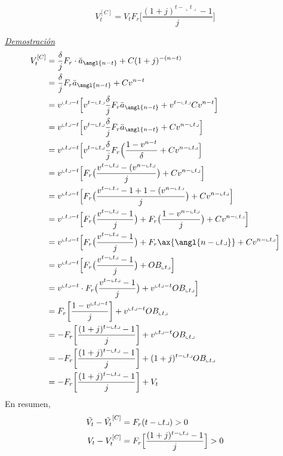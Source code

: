 \begin{proposition}
$$V_t^{[C]} = V_t F_r\Big[\frac{(1+j)^{t-\llcorner t\lrcorner}-1}{j}\Big]$$
\end{proposition}
\underline{\textit{Demostración}}
\begin{align*}
    V_t^{[C]} &= \frac{\delta}{j}F_r\cdot\Bar{a}_{\angl{n-t}} + C(1+j)^{-(n-t)}\\
    &= \frac{\delta}{j}F_r\Bar{a}_{\angl{n-t}} + Cv^{n-t}\\
    &= v^{\llcorner t\lrcorner-t}\Big[v^{t-\llcorner t\lrcorner}\frac{\delta}{j}F_r\Bar{a}_{\angl{n-t}} + v^{t-\llcorner t\lrcorner} Cv^{n-t}\Big]\\
    &= v^{\llcorner t\lrcorner-t}\Big[v^{t-\llcorner t\lrcorner}\frac{\delta}{j}F_r\Bar{a}_{\angl{n-t}} + Cv^{n-\llcorner t\lrcorner}\Big]\\
    &= v^{\llcorner t\lrcorner-t}\Big[v^{t-\llcorner t\lrcorner}\frac{\delta}{j}F_r\Big(\frac{1-v^{n-t}}{\delta} + Cv^{n-\llcorner t\lrcorner}\Big]\\
    &= v^{\llcorner t\lrcorner-t}\Big[F_r\big(\frac{v^{t-\llcorner t\lrcorner}-(v^{n-\llcorner t\lrcorner}}{j}\big) + Cv^{n-\llcorner t\lrcorner}\Big]\\
    &= v^{\llcorner t\lrcorner-t}\Big[F_r\big(\frac{v^{t-\llcorner t\lrcorner}-1+1-(v^{n-\llcorner t\lrcorner}}{j}\big) + Cv^{n-\llcorner t\lrcorner}\Big]\\
    &= v^{\llcorner t\lrcorner-t}\Big[F_r\big(\frac{v^{t-\llcorner t\lrcorner}-1}{j}\big) + F_r\big(\frac{1-v^{n-\llcorner t\lrcorner}}{j}\big) + Cv^{n-\llcorner t\lrcorner}\Big]\\
    &= v^{\llcorner t\lrcorner-t}\Big[F_r\big(\frac{v^{t-\llcorner t\lrcorner}-1}{j}\big) + F_r\ax{\angl{n-\llcorner t\lrcorner}} + Cv^{n-\llcorner t\lrcorner}\Big]\\
    &= v^{\llcorner t\lrcorner-t}\Big[F_r\big(\frac{v^{t-\llcorner t\lrcorner}-1}{j}\big) + OB_{\llcorner t\lrcorner}\Big]\\
    &= v^{\llcorner t\lrcorner-t}\cdot F_r\big(\frac{v^{t-\llcorner t\lrcorner}-1}{j}\big) + v^{\llcorner t\lrcorner-t}OB_{\llcorner t\lrcorner}\Big]\\
    &= F_r\bigg[\frac{1-v^{\llcorner t\lrcorner-t}}{j}\bigg] + v^{\llcorner t\lrcorner-t}OB_{\llcorner t\lrcorner}\\
    &= -F_r\bigg[\frac{(1+j)^{t-\llcorner t\lrcorner}-1}{j}\bigg] + v^{\llcorner t\lrcorner-t}OB_{\llcorner t\lrcorner}\\
    &= -F_r\bigg[\frac{(1+j)^{t-\llcorner t\lrcorner}-1}{j}\bigg] + (1+j)^{t-\llcorner t\lrcorner}OB_{\llcorner t\lrcorner}\\
    &= -F_r\bigg[\frac{(1+j)^{t-\llcorner t\lrcorner}-1}{j}\bigg] + V_t
\end{align*}
En resumen,
\begin{align*}
    \Tilde{V_t} - \Tilde{V_t}^{[C]} &= F_r(t- \llcorner t\lrcorner)>0\\
    V_t - V_t^{[C]} &= F_r\Big[\frac{(1+j)^{t- \llcorner t\lrcorner}-1}{j}\Big]>0
\end{align*}

